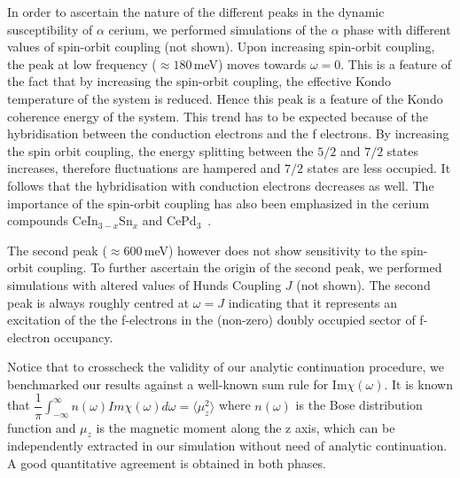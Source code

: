 \documentclass[10pt]{ruthesis}
\begin{document}
{In order to ascertain the nature of the different peaks in the dynamic
susceptibility of $\alpha$ cerium, we performed simulations of the
$\alpha$ phase with different values of spin-orbit coupling (not
shown).  Upon increasing spin-orbit coupling, the peak at low frequency
($\approx 180\,$meV) moves towards $\omega=0$.  This is a feature of
the fact that by increasing the spin-orbit coupling, the effective
Kondo temperature of the system is reduced.  Hence this peak is a
feature of the Kondo coherence energy of the system.  This trend has to
be expected because of the hybridisation between the conduction
electrons and the f electrons. By increasing the spin orbit coupling,
the energy splitting between the $5/2$ and $7/2$ states increases,
therefore fluctuations are hampered and $7/2$ states are less
occupied. It follows that the hybridisation with conduction electrons
decreases as well.  The importance of the spin-orbit coupling has also
been emphasized in the cerium compounds CeIn$_{3-x}$Sn$_x$ and
CePd$_3$~\cite{muraniSO, muraniCePd3, cox1987}.

The second peak ($\approx 600\,$meV) however does not show sensitivity
to the spin-orbit coupling.  To further ascertain the origin of the
second peak, we performed simulations with altered values of Hunds
Coupling $J$ (not shown).  The second peak is always roughly centred
at $\omega=J$ indicating that it represents an excitation of the the
f-electrons in the (non-zero) doubly occupied sector of f-electron
occupancy.

Notice that to crosscheck the validity of our analytic continuation
procedure, we benchmarked our results against a well-known sum rule
for Im$\chi(\omega)$. It is known that
$\dfrac{1}{\pi}\int_{-\infty}^{\infty} n(\omega)Im\chi(\omega) d\omega
= \langle \mu_{z}^{2} \rangle$ where $n(\omega)$ is the Bose
distribution function and $\mu_{z}$ is the magnetic moment along the z
axis, which can be independently extracted in our simulation without
need of analytic continuation.  A good quantitative agreement is
obtained in both phases.




}
\end{document}
